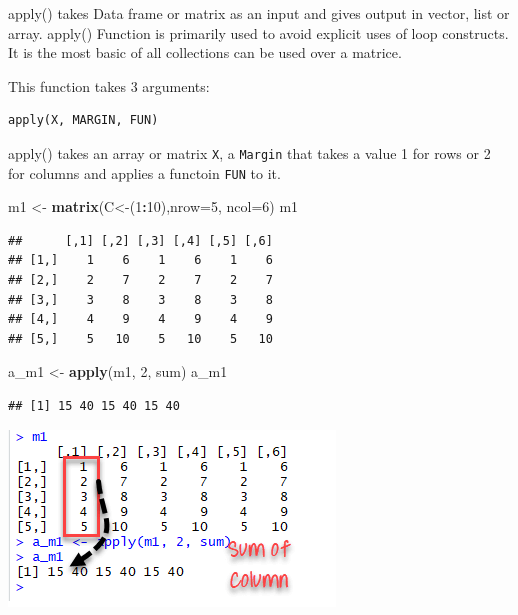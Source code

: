 \documentclass[
]{book}
\newenvironment{Shaded}{\begin{snugshade}}{\end{snugshade}}
\newcommand{\DataTypeTok}[1]{\textcolor[rgb]{0.13,0.29,0.53}{#1}}
\newcommand{\DecValTok}[1]{\textcolor[rgb]{0.00,0.00,0.81}{#1}}
\newcommand{\KeywordTok}[1]{\textcolor[rgb]{0.13,0.29,0.53}{\textbf{#1}}}
\newcommand{\NormalTok}[1]{#1}
\newcommand{\OperatorTok}[1]{\textcolor[rgb]{0.81,0.36,0.00}{\textbf{#1}}}
\newcommand{\StringTok}[1]{\textcolor[rgb]{0.31,0.60,0.02}{#1}}
\begin{document}
apply() takes Data frame or matrix as an input and gives output in vector, list or array. apply() Function is primarily used to avoid explicit uses of loop constructs. It is the most basic of all collections can be used over a matrice.

This function takes 3 arguments:

\begin{verbatim}
apply(X, MARGIN, FUN)
\end{verbatim}

apply() takes an array or matrix \texttt{X}, a \texttt{Margin} that takes a value 1 for rows or 2 for columns and applies a functoin \texttt{FUN} to it.

\begin{Shaded}
\begin{Highlighting}[]
\NormalTok{m1 <-}\StringTok{ }\KeywordTok{matrix}\NormalTok{(C<-(}\DecValTok{1}\OperatorTok{:}\DecValTok{10}\NormalTok{),}\DataTypeTok{nrow=}\DecValTok{5}\NormalTok{, }\DataTypeTok{ncol=}\DecValTok{6}\NormalTok{)}
\NormalTok{m1}
\end{Highlighting}
\end{Shaded}

\begin{verbatim}
##      [,1] [,2] [,3] [,4] [,5] [,6]
## [1,]    1    6    1    6    1    6
## [2,]    2    7    2    7    2    7
## [3,]    3    8    3    8    3    8
## [4,]    4    9    4    9    4    9
## [5,]    5   10    5   10    5   10
\end{verbatim}

\begin{Shaded}
\begin{Highlighting}[]
\NormalTok{a_m1 <-}\StringTok{ }\KeywordTok{apply}\NormalTok{(m1, }\DecValTok{2}\NormalTok{, sum)}
\NormalTok{a_m1}
\end{Highlighting}
\end{Shaded}

\begin{verbatim}
## [1] 15 40 15 40 15 40
\end{verbatim}

\includegraphics{img/apply.png}
\end{document}
